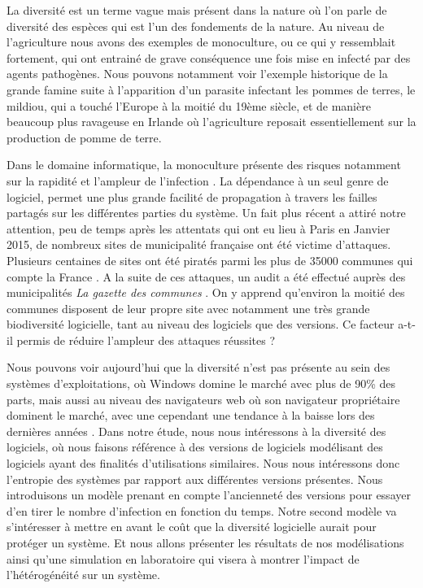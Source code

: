 La diversité est un terme vague mais présent dans la nature où l’on parle de diversité des espèces qui est l’un des fondements de la nature. Au niveau de l’agriculture nous avons des exemples de monoculture, ou ce qui y ressemblait fortement, qui ont entrainé de grave conséquence une fois mise en infecté par des agents pathogènes. Nous pouvons notamment voir l’exemple historique de la grande famine suite à l’apparition d’un parasite infectant les pommes de terres, le mildiou, qui a touché l’Europe à la moitié du 19ème siècle, et de manière beaucoup plus ravageuse en Irlande où l’agriculture reposait essentiellement sur la production de pomme de terre.

Dans le domaine informatique, la monoculture présente des risques notamment sur la rapidité et l’ampleur de l’infection \cite{risksOfMonoculture}. La dépendance à un seul genre de logiciel, permet une plus grande facilité de propagation à travers les failles partagés sur les différentes parties du système.
Un fait plus récent a attiré notre attention, peu de temps après les attentats qui ont eu lieu à Paris en Janvier 2015, de nombreux sites de municipalité française ont été victime d’attaques. Plusieurs centaines de sites ont été piratés parmi les plus de 35000 communes qui compte la France \cite{communes_INSEE}. A la suite de ces attaques, un audit a été effectué auprès des municipalités \textit{La gazette des communes} . On y apprend qu’environ la moitié des communes disposent de leur propre site avec notamment une très grande biodiversité logicielle, tant au niveau des logiciels que des versions. Ce facteur a-t-il permis de réduire l’ampleur des attaques réussites ?

Nous pouvons voir aujourd’hui que la diversité n’est pas présente au sein des systèmes d’exploitations, où Windows domine le marché avec plus de 90\% des parts, mais aussi au niveau des navigateurs web où son navigateur propriétaire dominent le marché, avec une cependant une tendance à la baisse lors des dernières années \cite{netMarketShare}. 
Dans notre étude, nous nous intéressons à la diversité des logiciels, où nous faisons référence à des versions de logiciels modélisant des logiciels ayant des finalités d’utilisations similaires. Nous nous intéressons donc l’entropie des systèmes par rapport aux différentes versions présentes. Nous introduisons un modèle prenant en compte l’ancienneté des versions pour essayer d’en tirer le nombre d’infection en fonction du temps. Notre second modèle va s’intéresser à mettre en avant le coût que la diversité logicielle aurait pour protéger un système. 
Et nous allons présenter les résultats de nos modélisations ainsi qu’une simulation en laboratoire qui visera à montrer l’impact de l’hétérogénéité sur un système.

